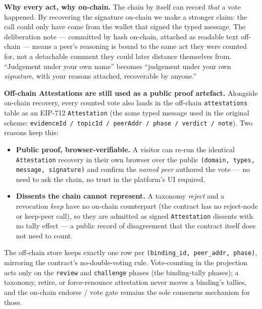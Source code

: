 \documentclass[11pt,a4paper]{article}
\begin{document}
\begin{notebox}
\textbf{Why every act, why on-chain.} The chain by itself can record
\emph{that} a vote happened. By recovering the signature on-chain we
make a stronger claim: the call could only have come from the wallet
that signed the typed message. The deliberation note --- committed by
hash on-chain, attached as readable text off-chain --- means a peer's
reasoning is bound to the same act they were counted for, not a
detachable comment they could later distance themselves from.
``Judgement under your own name'' becomes ``judgement under your own
\emph{signature}, with your reasons attached, recoverable by anyone.''
\end{notebox}

\textbf{Off-chain Attestations are still used as a public proof
artefact.} Alongside on-chain recovery, every counted vote also lands
in the off-chain \texttt{attestations} table as an EIP-712
\texttt{Attestation} (the same typed message used in the original
scheme: \texttt{evidenceId / topicId / peerAddr / phase / verdict /
note}). Two reasons keep this:

\begin{itemize}[leftmargin=1.4em]
  \item \textbf{Public proof, browser-verifiable.} A visitor can re-run
  the identical \texttt{Attestation} recovery in their own browser over
  the public \texttt{(domain, types, message, signature)} and confirm
  the \emph{named peer} authored the vote --- no need to ask the chain,
  no trust in the platform's UI required.
  \item \textbf{Dissents the chain cannot represent.} A taxonomy
  \emph{reject} and a revocation \emph{keep} have no on-chain
  counterpart (the contract has no reject-node or keep-peer call), so
  they are admitted as signed \texttt{Attestation} dissents with no
  tally effect --- a public record of disagreement that the contract
  itself does not need to count.
\end{itemize}

The off-chain store keeps exactly one row per \texttt{(binding\_id,
peer\_addr, phase)}, mirroring the contract's no-double-voting rule.
Vote-counting in the projection acts only on the
\texttt{review} and \texttt{challenge} phases (the binding-tally
phases); a taxonomy, retire, or force-renounce attestation never moves
a binding's tallies, and the on-chain endorse / vote gate remains the
sole consensus mechanism for those.

\end{document}
